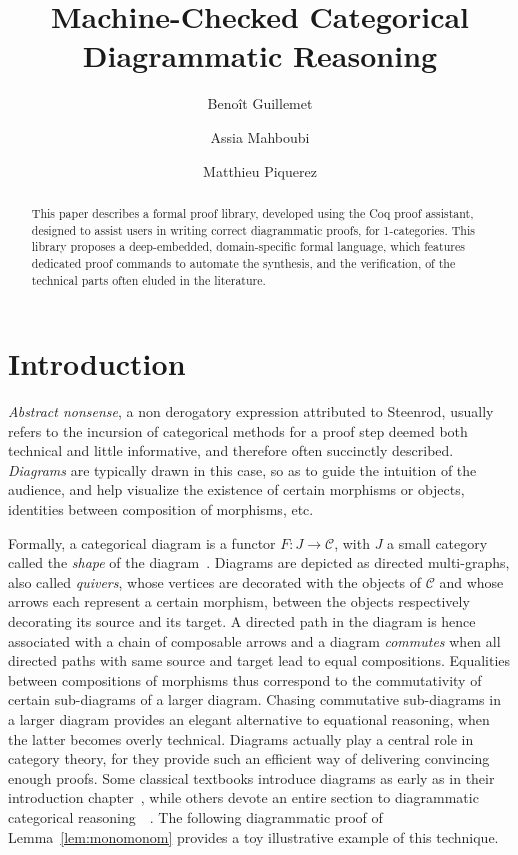 \documentclass[a4paper,UKenglish,cleveref, autoref, thm-restate]{lipics-v2021}
\title{Machine-Checked Categorical Diagrammatic Reasoning} %
\author{Benoît Guillemet}{École normale supérieure Paris-Saclay, France}{}{}{}%
\author{Assia Mahboubi}{Nantes Université, École Centrale Nantes, CNRS, INRIA, LS2N, UMR 6004, France \and Vrije Universiteit Amsterdam, the Netherlands}{}{0000-0002-0312-5461}{} %
\author{Matthieu Piquerez}{Nantes Université, École Centrale Nantes, CNRS, INRIA, LS2N, UMR 6004, France}{}{0009-0002-1126-4725}{}
\begin{document}
\maketitle

\begin{abstract}
This paper describes a formal proof library, developed using the Coq proof assistant, designed to assist users in writing correct diagrammatic proofs, for 1-categories.  This library proposes a deep-embedded, domain-specific formal language, which features dedicated proof commands to automate the synthesis, and the verification, of the technical parts often eluded in the literature.
\end{abstract}





\section{Introduction}\label{sec:intro}

\emph{Abstract nonsense}, a non derogatory expression attributed to Steenrod, usually refers to the incursion of categorical methods for a proof step deemed both technical and little informative, and therefore often succinctly described. \emph{Diagrams} are typically drawn in this case, so as to guide the intuition of the audience, and help visualize the existence of certain morphisms or objects, identities between composition of morphisms, etc.

Formally, a categorical diagram is a functor $F\colon J \rightarrow \mathcal{C}$, with $J$ a small category called the \emph{shape} of the diagram~\cite{zbMATH01324388}. Diagrams are depicted as directed multi-graphs, also called \emph{quivers}, whose vertices are decorated with the objects of $\mathcal{C}$ and whose arrows each represent a certain morphism, between the objects respectively decorating its source and its target. A directed path in the diagram is hence associated with a chain of composable arrows and a diagram \emph{commutes} when all directed paths with same source and target lead to equal compositions. Equalities between compositions of morphisms thus correspond to the commutativity of certain sub-diagrams of a larger diagram. Chasing commutative sub-diagrams in a larger diagram provides an elegant alternative to equational reasoning, when the latter becomes overly technical. Diagrams actually play a central role in category theory, for they provide such an efficient way of delivering convincing enough proofs. Some classical textbooks introduce diagrams as early as in their introduction chapter~\cite{zbMATH01216133}, while others devote an entire section to diagrammatic categorical reasoning~\cite[Section 1.6]{riehl}~\cite[Session 17]{zbMATH05593534}. The following diagrammatic proof of Lemma~\ref{lem:monomonom} provides a toy illustrative example of this technique.
\end{document}
